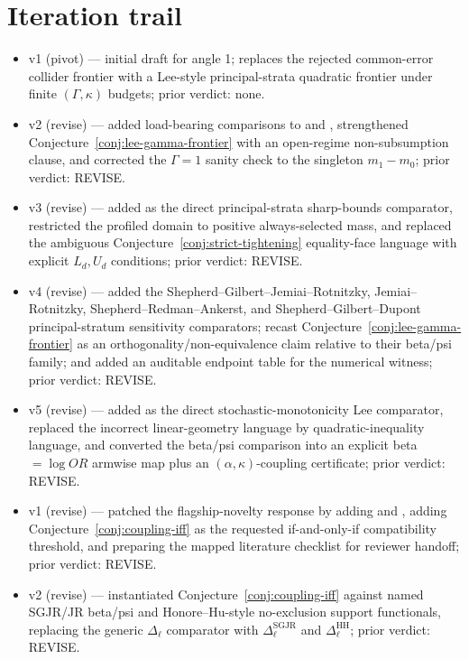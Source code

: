 \documentclass[11pt]{article}
\theoremstyle{definition}
\theoremstyle{plain}
\theoremstyle{remark}
\begin{document}
\section{Iteration trail}
\begin{itemize}[leftmargin=*]
\item v1 (pivot) --- initial draft for angle 1; replaces the rejected common-error collider frontier with a Lee-style principal-strata quadratic frontier under finite \((\Gamma,\kappa)\) budgets; prior verdict: none.
\item v2 (revise) --- added load-bearing comparisons to \citet{LaffersNedela2017Sensitivity} and \citet{Semenova2025GeneralizedLee}, strengthened Conjecture~\ref{conj:lee-gamma-frontier} with an open-regime non-subsumption clause, and corrected the \(\Gamma=1\) sanity check to the singleton \(m_1-m_0\); prior verdict: REVISE.
\item v3 (revise) --- added \citet{HuberMellace2015SharpSelection} as the direct principal-strata sharp-bounds comparator, restricted the profiled domain to positive always-selected mass, and replaced the ambiguous Conjecture~\ref{conj:strict-tightening} equality-face language with explicit \(L_d,U_d\) conditions; prior verdict: REVISE.
\item v4 (revise) --- added the Shepherd--Gilbert--Jemiai--Rotnitzky, Jemiai--Rotnitzky, Shepherd--Redman--Ankerst, and Shepherd--Gilbert--Dupont principal-stratum sensitivity comparators; recast Conjecture~\ref{conj:lee-gamma-frontier} as an orthogonality/non-equivalence claim relative to their beta/psi family; and added an auditable endpoint table for the numerical witness; prior verdict: REVISE.
\item v5 (revise) --- added \citet{Okamoto2025RobustifyLee} as the direct stochastic-monotonicity Lee comparator, replaced the incorrect linear-geometry language by quadratic-inequality language, and converted the beta/psi comparison into an explicit beta \(=\log OR\) armwise map plus an \((\alpha,\kappa)\)-coupling certificate; prior verdict: REVISE.
\item v1 (revise) --- patched the flagship-novelty response by adding \citet{EglestonScharfsteinFreemanWest2007} and \citet{HonoreHu2020Selection}, adding Conjecture~\ref{conj:coupling-iff} as the requested if-and-only-if compatibility threshold, and preparing the mapped literature checklist for reviewer handoff; prior verdict: REVISE.
\item v2 (revise) --- instantiated Conjecture~\ref{conj:coupling-iff} against named SGJR/JR beta/psi and Honore--Hu-style no-exclusion support functionals, replacing the generic \(\Delta_\ell\) comparator with \(\Delta_\ell^{\mathrm{SGJR}}\) and \(\Delta_\ell^{\mathrm{HH}}\); prior verdict: REVISE.

\end{itemize}
\end{document}
